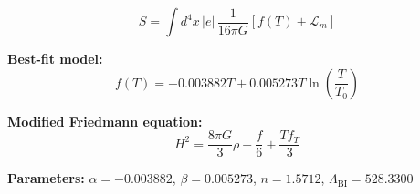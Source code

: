 
\begin{equation}
  S = \int d^4x \, |e| \, \frac{1}{16\pi G} \left[ f(T) + \mathcal{L}_m \right]
\end{equation}

\textbf{Best-fit model:}
\begin{equation}
  f(T) = -0.003882 T + 0.005273 T \ln\!\left(\frac{T}{T_0}\right)
\end{equation}

\textbf{Modified Friedmann equation:}
\begin{equation}
  H^2 = \frac{8\pi G}{3} \rho - \frac{f}{6} + \frac{T f_T}{3}
\end{equation}

\textbf{Parameters:}
$\alpha = -0.003882$, \quad
$\beta = 0.005273$, \quad
$n = 1.5712$, \quad
$\Lambda_{\text{BI}} = 528.3300$